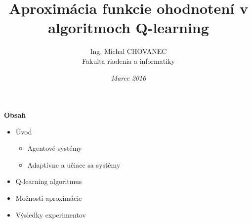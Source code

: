 \documentclass[xcolor=dvipsnames]{beamer}
\title{\bf Aproximácia funkcie ohodnotení v algoritmoch Q-learning}
\author{Ing. Michal CHOVANEC \\Fakulta riadenia a informatiky}
\date[EURP]{\it Marec 2016}
\begin{document}
\begin{frame}
\titlepage
\end{frame}

\begin{frame}{\bf Obsah}

\begin{itemize}
  \item Úvod
    \begin{itemize}
    \item Agentové systémy
    \item Adaptívne a učiace sa systémy
    \end{itemize}
  \item Q-learning algoritmus
  \item Možnosti aproximácie
  \item Výsledky experimentov
\end{itemize}

\end{frame}
\end{document}
